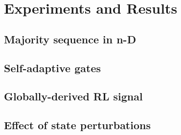 \section{Experiments and Results}\label{s:results}


\subsection{Majority sequence in n-D}




\subsection{Self-adaptive gates}


\subsection{Globally-derived RL signal}


\subsection{Effect of state perturbations} %






